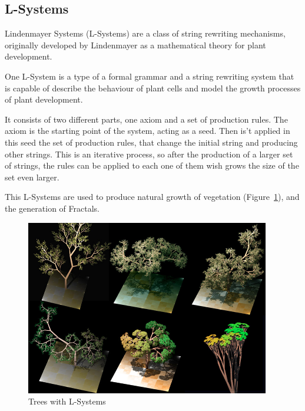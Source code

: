 
\subsection{L-Systems} %
\label{ssub:l_systems}

Lindenmayer Systems (L-Systems) are a class of string rewriting mechanisms, originally developed by Lindenmayer as a mathematical theory for plant development.

One L-System is a type of a formal grammar and a string rewriting system that is capable of describe the behaviour of plant cells and model the growth processes of plant development.

It consists of two different parts, one axiom and a set of production rules. The axiom is the starting point of the system, acting as a seed. Then is't applied in this seed the set of production rules, that change the initial string and producing other strings.
This is an iterative process, so after the production of a larger set of strings, the rules can be applied to each one of them wish grows the size of the set even larger.

This L-Systems are used to produce natural growth of vegetation (Figure~\ref{fig:trees}), and the generation of Fractals. 


\begin{figure}[htbp]
    \centering
    \includegraphics[width=0.95\textwidth]{img/Theory/L_Systems/Dragon_trees.jpg}
    \caption{Trees with L-Systems}
    \label{fig:trees}
\end{figure}


